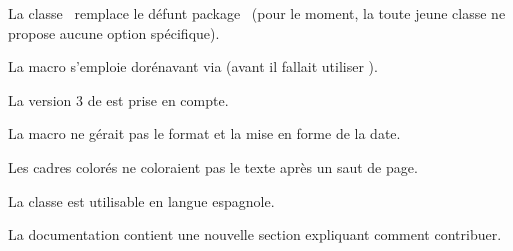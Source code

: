\begin{tdocbreak}
	\item La classe \thisproj\ remplace le défunt package \thisproj\ (pour le moment, la toute jeune classe ne propose aucune option spécifique).

	\item La macro  s'emploie dorénavant via  (avant il fallait utiliser ).
\end{tdocbreak}


\begin{tdocfix}
	\item La version 3 de  est prise en compte.

	\item La macro  ne gérait pas le format et la mise en forme de la date.

	\item Les cadres colorés ne coloraient pas le texte après un saut de page.
\end{tdocfix}


\begin{tdocnew}
	\item La classe est utilisable en langue espagnole.

	\item La documentation contient une nouvelle section expliquant comment contribuer.
\end{tdocnew}
